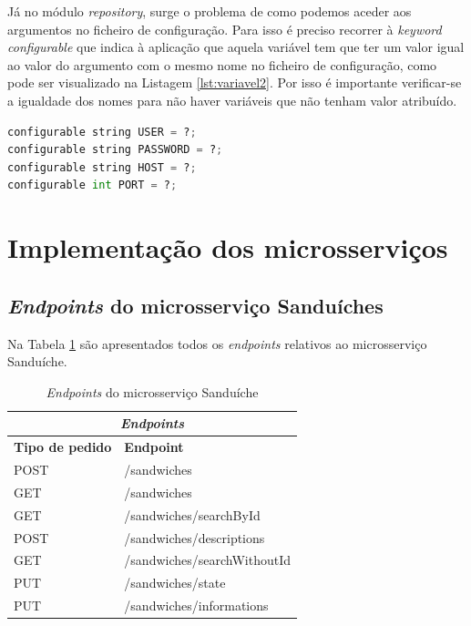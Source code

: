 Já no módulo \textit{repository}, surge o problema de como podemos aceder aos argumentos no ficheiro de configuração. Para isso é preciso recorrer à \textit{keyword configurable} que indica à aplicação que aquela variável tem que ter um valor igual ao valor do argumento com o mesmo nome no ficheiro de configuração, como pode ser visualizado na Listagem \ref{lst:variavel2}. Por isso é importante verificar-se a igualdade dos nomes para não haver variáveis que não tenham valor atribuído. 

\begin{minipage}{0.9\linewidth}
\begin{lstlisting}[language=python, caption=Invocação das variáveis do sistema., label=lst:variavel2]
configurable string USER = ?;
configurable string PASSWORD = ?; 
configurable string HOST = ?;
configurable int PORT = ?;
\end{lstlisting}
\end{minipage}

\section{Implementação dos microsserviços}
\subsection{\textit{Endpoints} do microsserviço Sanduíches}

Na Tabela \ref{table:endpoints1} são apresentados todos os \textit{endpoints} relativos ao microsserviço Sanduíche.

\begin{table}[H]
\caption{\textit{Endpoints} do microsserviço Sanduíche}
\label{table:endpoints1}
\begin{center}
\begin{tabular}{ |p{4cm}|p{6cm}|  }
\hline
\multicolumn{2}{|c|}{\textit{Endpoints}} \\
\hline
\textbf{Tipo de pedido} & \textbf{Endpoint}\\
\hline
POST & /sandwiches \\
\hline
GET & /sandwiches \\
\hline
GET & /sandwiches/searchById \\
\hline
POST & /sandwiches/descriptions \\
\hline
GET & /sandwiches/searchWithoutId \\
\hline
PUT & /sandwiches/state \\
\hline
PUT & /sandwiches/informations \\
\hline
\end{tabular} 
\end{center}
\end{table}


